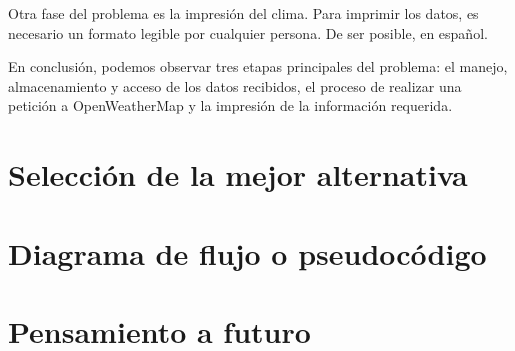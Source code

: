 \documentclass[]{article}
\begin{document}
Otra fase del problema es la impresión del clima. Para imprimir los datos, es 
necesario un formato legible por cualquier persona. De ser posible, en 
español.

En conclusión, podemos observar tres etapas principales del problema: 
el manejo, almacenamiento y acceso de los datos recibidos, el proceso de 
realizar una petición a OpenWeatherMap y la impresión de la información 
requerida.

\section{Selección de la mejor alternativa}
\section{Diagrama de flujo o pseudocódigo}
\section{Pensamiento a futuro}
\end{document}
